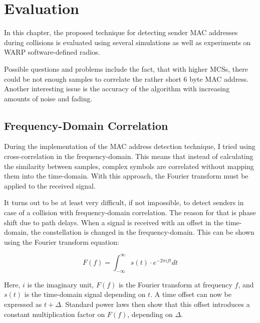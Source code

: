 
\chapter{Evaluation}\label{ch:evaluation}
\glsresetall %

In this chapter, the proposed technique for detecting sender MAC addresses during collisions is evaluated using several simulations as well as experiments on WARP software-defined radios.

Possible questions and problems include the fact, that with higher \glspl{MCS}, there could be not enough samples to correlate the rather short 6 byte MAC address. Another interesting issue is the accuracy of the algorithm with increasing amounts of noise and fading.



\section{Frequency-Domain Correlation}\label{sec:freqd-correlation}

During the implementation of the MAC address detection technique, I tried using cross-correlation in the frequency-domain. This means that instead of calculating the similarity between samples, complex symbols are correlated without mapping them into the time-domain. With this approach, the Fourier transform must be applied to the received signal.

It turns out to be at least very difficult, if not impossible, to detect senders in case of a collision with frequency-domain correlation. The reason for that is phase shift due to path delays. When a signal is received with an offset in the time-domain, the constellation is changed in the frequency-domain. This can be shown using the Fourier transform equation:

$$ F(f) = \int_{-\infty}^{\infty} s(t) \cdot e^{-2 \pi i f t} dt $$

Here, $ i $ is the imaginary unit, $ F(f) $ is the Fourier transform at frequency $ f $, and $ s(t) $ is the time-domain signal depending on $ t $. A time offset can now be expressed as $ t + \Delta $. Standard power laws then show that this offset introduces a constant multiplication factor on $ F(f) $, depending on $ \Delta $.

